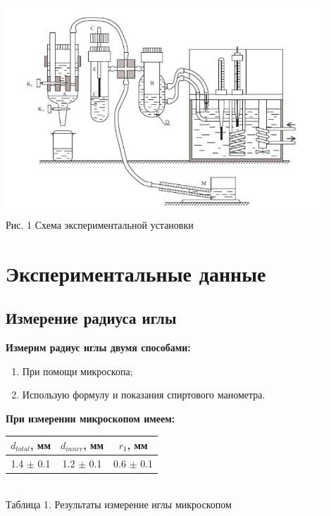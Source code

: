 \documentclass[a4paper, 12pt]{article}
\begin{document}
	\begin{center}
		\includegraphics[width= 12cm, height= 8cm]{"Установка.jpg"}\\
		Рис. 1 Схема экспериментальной установки
	\end{center}
	
	\section{Экспериментальные данные}
	
	\subsection[Игла]{Измерение радиуса иглы}
	\textbf{Измерим радиус иглы двумя способами:}
	\begin{enumerate}
		\item При помощи микроскопа;
		\item Использую формулу и показания спиртового манометра.
	\end{enumerate}

	\textbf{При измерении микроскопом имеем:}
	\begin{center}
		\begin{tabular} {|c | c |c |}
			\hline	
			$d_{total}$, мм & $d_{inner}$, мм & $r_1$, мм \\
			\hline
			1.4 $\pm$ 0.1 & 1.2 $\pm$ 0.1 & 0.6 $\pm$ 0.1  \\
			\hline
		\end{tabular}\\
		Таблица 1. Результаты измерение иглы микроскопом
	\end{center}
\end{document}
